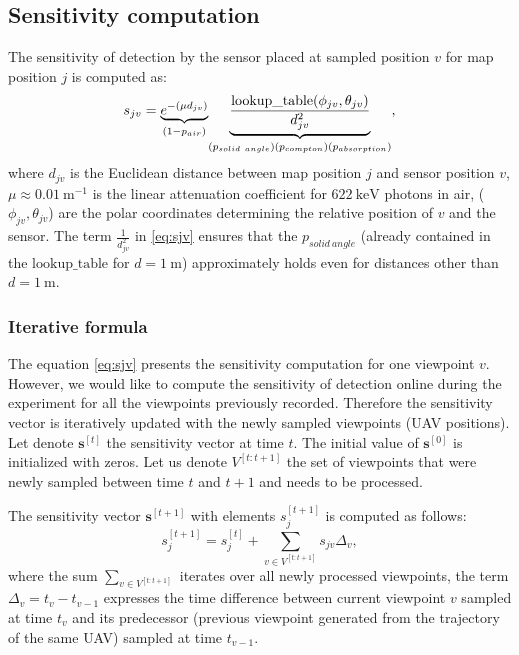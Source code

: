 \subsection{Sensitivity computation}%
The sensitivity of detection by the sensor placed at sampled position $v$ for map position $j$ is computed as:
\begin{equation}
  s_{jv} = \underset{(1-p_{air})}{\underbrace{e^{-(\mu d_{jv})} }} \underset{(p_{solid\ angle})\\(p_{compton})\\(p_{absorption})} {\underbrace{\frac{\mathrm{lookup\_table}(\phi_{jv}, \theta_{jv})}{d^{2}_{jv}}}},  
  \label{eq:sjv}
\end{equation}
where $d_{jv}$ is the Euclidean distance between map position $j$ and sensor position $v$, $\mu \approx \SI{0.01}{\meter^{-1}} $ is the linear attenuation coefficient for $\SI{622}{\kilo\electronvolt}$ photons in air, ($\phi_{jv}, \theta_{jv}$) are the polar coordinates determining the relative position of $v$ and the sensor. 
The term $\frac{1}{d^{2}_{jv}}$ in \ref{eq:sjv} ensures that the $p_{solid\ angle}$ (already contained in the $\mathrm{lookup\_table}$ for $d = \SI{1}\meter$) approximately holds even for distances other than $d = \SI{1}\meter$.

\subsubsection{Iterative formula}
The equation \ref{eq:sjv} presents the sensitivity computation for one viewpoint $v$. 
However, we would like to compute the sensitivity of detection online during the experiment for all the viewpoints previously recorded. %
Therefore the sensitivity vector is iteratively updated with the newly sampled viewpoints (\ac{UAV} positions).
Let denote $\mathbf{s}^{[t]}$ the sensitivity vector at time $t$.
The initial value of $\mathbf{s}^{[0]}$ is initialized with zeros. %
Let us denote $V^{[t:t+1]}$ the set of viewpoints that were newly sampled between time $t$ and $t+1$ and needs to be processed. 

The sensitivity vector $\mathbf{s}^{[t+1]}$ with elements $s_{j}^{[t+1]}$ is computed as follows:
\begin{equation}
  s_{j}^{[t+1]} = s_{j}^{[t]} + \sum_{v \in V^{[t:t+1]}} s_{jv} \Delta_{v}, 
  \label{eq:sen_iter}
\end{equation}
where the sum $\sum_{v \in V^{[t:t+1]}}$ iterates over all newly processed viewpoints, 
the term $\Delta_{v} = t_{v} - t_{v-1}$ expresses the time difference between current viewpoint $v$ sampled at time $t_{v}$ and its predecessor (previous viewpoint generated from the trajectory of the same \ac{UAV}) sampled at time $t_{v-1}$. 

